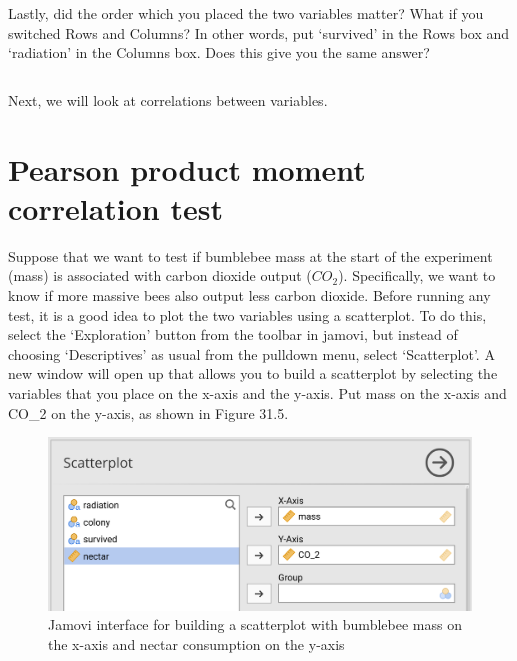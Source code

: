 \documentclass[
]{scrbook}
\begin{document}
\begin{verbatim}



\end{verbatim}

Lastly, did the order which you placed the two variables matter?
What if you switched Rows and Columns?
In other words, put `survived' in the Rows box and `radiation' in the Columns box.
Does this give you the same answer?

\begin{verbatim}

\end{verbatim}

Next, we will look at correlations between variables.

\hypertarget{pearson-product-moment-correlation-test}{%
\section{Pearson product moment correlation test}\label{pearson-product-moment-correlation-test}}

Suppose that we want to test if bumblebee mass at the start of the experiment (mass) is associated with carbon dioxide output (\(CO_{2}\)).
Specifically, we want to know if more massive bees also output less carbon dioxide.
Before running any test, it is a good idea to plot the two variables using a scatterplot.
To do this, select the `Exploration' button from the toolbar in jamovi, but instead of choosing `Descriptives' as usual from the pulldown menu, select `Scatterplot'.
A new window will open up that allows you to build a scatterplot by selecting the variables that you place on the x-axis and the y-axis.
Put mass on the x-axis and CO\_2 on the y-axis, as shown in Figure 31.5.

\begin{figure}
\includegraphics[width=1\linewidth]{img/jamovi_simple_scatterplot} \caption{Jamovi interface for building a scatterplot with bumblebee mass on the x-axis and nectar consumption on the y-axis}\label{fig:unnamed-chunk-155}
\end{figure}
\end{document}
